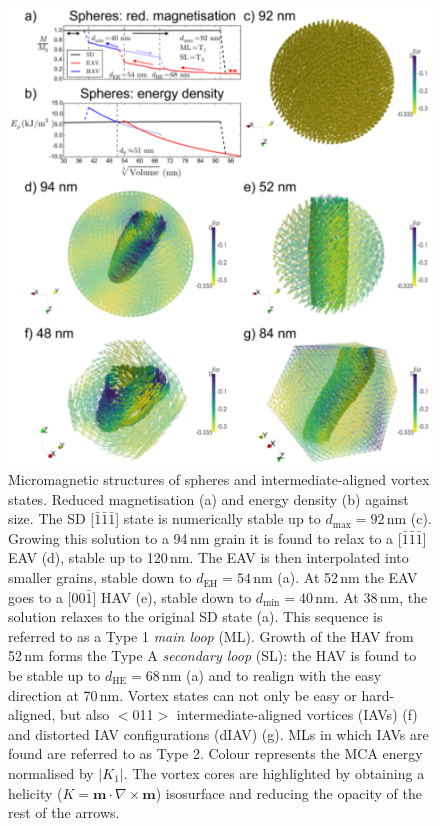 \documentclass[review]{elsarticle}
\newcommand{\dmax}{d_\text{max}}
\newcommand{\dmin}{d_\text{min}}
\begin{document}
\allowdisplaybreaks

\begin{figure}[ht]
\centering
\includegraphics[width=\textwidth]{Figure_02.pdf}
\caption{Micromagnetic structures of spheres and intermediate-aligned vortex states. Reduced magnetisation (a) and energy density (b) against size. The SD [$\bar{1}\bar{1}\bar{1}$] state is numerically stable up to $\dmax=92\,\text{nm}$ (c). Growing this solution to a 94$\,\text{nm}$ grain it is found to relax to a [$\bar{1}\bar{1}\bar{1}$] EAV (d), stable up to 120$\,\text{nm}$. The EAV is then interpolated into smaller grains, stable down to $d_\text{EH}=54\,\text{nm}$ (a). At 52$\,\text{nm}$ the EAV goes to a [00$\bar{1}$] HAV (e), stable down to $\dmin=40\,\text{nm}$. At 38$\,\text{nm}$, the solution relaxes to the original SD state (a). This sequence is referred to as a Type 1 \textit{main loop} (ML). Growth of the HAV from 52$\,\text{nm}$ forms the Type A \textit{secondary loop} (SL): the HAV is found to be stable up to $d_{\text{HE}}=68\,\text{nm}$ (a) and to realign with the easy direction at 70$\,\text{nm}$. Vortex states can not only be easy or hard-aligned, but also $<$011$>$ intermediate-aligned vortices (IAVs) (f) and distorted IAV configurations (dIAV) (g). MLs in which IAVs are found are referred to as Type 2. Colour represents the MCA energy normalised by $|K_1|$. The vortex cores are highlighted by obtaining a helicity ($K=\boldsymbol{m}\cdot\nabla\times\boldsymbol{m}$) isosurface and reducing the opacity of the rest of the arrows.}
\label{fig2}
\end{figure}
\end{document}
